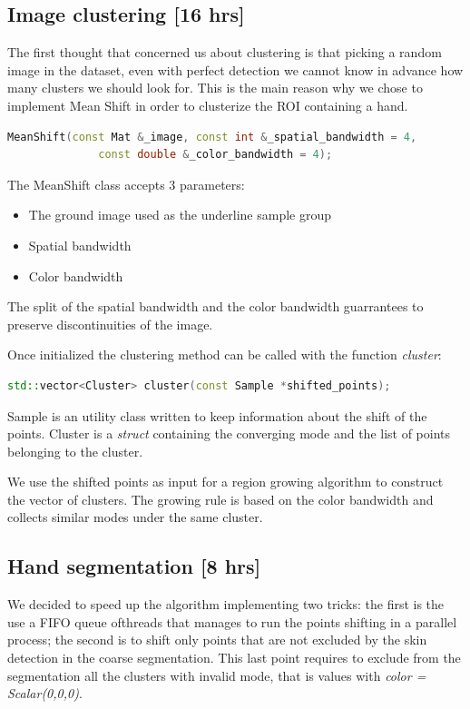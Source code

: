 \subsection{Image clustering [16 hrs]}
The first thought that concerned us about clustering is that picking a random
image in the dataset, even with perfect detection we cannot know in advance how
many clusters we should look for.
This is the main reason why we chose to implement Mean Shift in order to
clusterize the ROI containing a hand.

\begin{lstlisting}[language = c++]
    MeanShift(const Mat &_image, const int &_spatial_bandwidth = 4, 
              const double &_color_bandwidth = 4);
    \end{lstlisting}

The MeanShift class accepts 3 parameters:
\begin{itemize}
    \item The ground image used as the underline sample group
    \item Spatial bandwidth
    \item Color bandwidth
\end{itemize}

The split of the spatial bandwidth and the color bandwidth guarrantees to
preserve discontinuities of the image.

Once initialized the clustering method can be called with the function
\textit{cluster}:

\begin{lstlisting}[language = c++]
    std::vector<Cluster> cluster(const Sample *shifted_points);
    \end{lstlisting}

Sample is an utility class written to keep information about the shift of
the points.
Cluster is a \textit{struct} containing the converging mode and the list of
points belonging to the cluster.

We use the shifted points as input for a region growing algorithm to construct
the vector of clusters. The growing rule is based on the color bandwidth and
collects similar modes under the same cluster.

\subsection{Hand segmentation [8 hrs]}
We decided to speed up the algorithm implementing two tricks: the first is the
use a FIFO queue ofthreads that manages to run the points shifting in a
parallel process; the second is to shift only points that are not excluded by
the skin detection in the coarse
segmentation. This last point requires to exclude from the segmentation all the
clusters with invalid mode, that is values with \textit{color = Scalar(0,0,0)}.

